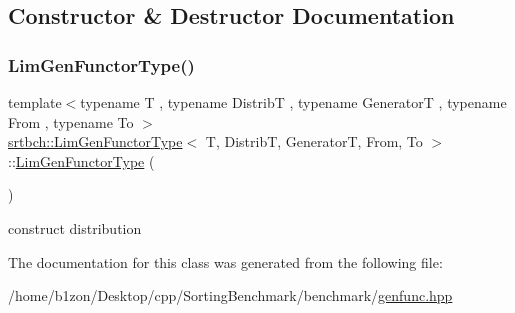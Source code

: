 \subsection{Constructor \& Destructor Documentation}
\mbox{\label{classsrtbch_1_1LimGenFunctorType_ab4a7249afd2cc44b0629061067316157}} 
\subsubsection{\texorpdfstring{Lim\+Gen\+Functor\+Type()}{LimGenFunctorType()}}
{\footnotesize\ttfamily template$<$typename T , typename DistribT , typename GeneratorT , typename From , typename To $>$ \\
\hyperlink{classsrtbch_1_1LimGenFunctorType}{srtbch\+::\+Lim\+Gen\+Functor\+Type}$<$ T, DistribT, GeneratorT, From, To $>$\+::\hyperlink{classsrtbch_1_1LimGenFunctorType}{Lim\+Gen\+Functor\+Type} (\begin{DoxyParamCaption}{ }\end{DoxyParamCaption})\hspace{0.3cm}{\ttfamily [inline]}}

construct distribution 

The documentation for this class was generated from the following file\+:\begin{DoxyCompactItemize}
\item 
/home/b1zon/\+Desktop/cpp/\+Sorting\+Benchmark/benchmark/\hyperlink{genfunc_8hpp}{genfunc.\+hpp}\end{DoxyCompactItemize}
